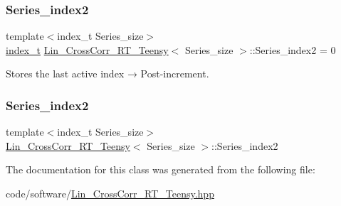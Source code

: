 \subsubsection{\texorpdfstring{Series\+\_\+index2}{Series\_index2}\hspace{0.1cm}{\footnotesize\ttfamily [1/2]}}
{\footnotesize\ttfamily template$<$index\+\_\+t Series\+\_\+size$>$ \\
\hyperlink{types_8hpp_ab41b824af8e088d090c0b9e60f536c9d}{index\+\_\+t} \hyperlink{classLin__CrossCorr__RT__Teensy}{Lin\+\_\+\+Cross\+Corr\+\_\+\+R\+T\+\_\+\+Teensy}$<$ Series\+\_\+size $>$\+::Series\+\_\+index2 = 0}



Stores the last active index → Post-\/increment. 

\mbox{\label{classLin__CrossCorr__RT__Teensy_a4f84a456a7d6e90e8676e4c5ed059776}} 
\subsubsection{\texorpdfstring{Series\+\_\+index2}{Series\_index2}\hspace{0.1cm}{\footnotesize\ttfamily [2/2]}}
{\footnotesize\ttfamily template$<$index\+\_\+t Series\+\_\+size$>$ \\
\hyperlink{classLin__CrossCorr__RT__Teensy}{Lin\+\_\+\+Cross\+Corr\+\_\+\+R\+T\+\_\+\+Teensy}$<$ Series\+\_\+size $>$\+::Series\+\_\+index2}



The documentation for this class was generated from the following file\+:\begin{DoxyCompactItemize}
\item 
code/software/\hyperlink{Lin__CrossCorr__RT__Teensy_8hpp}{Lin\+\_\+\+Cross\+Corr\+\_\+\+R\+T\+\_\+\+Teensy.\+hpp}\end{DoxyCompactItemize}
